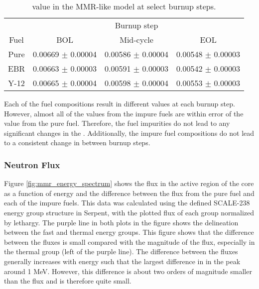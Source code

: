\begin{table}
        \centering
        \caption{\betaEff value in the \gls{MMR}-like model at 
        select burnup steps.}
        \label{tab:mmr_betaeff}
        \begin{tabular}{c c c c}
                \hline 
                 & \multicolumn{3}{c}{Burnup step}\\
                Fuel & \gls{BOL} & Mid-cycle & \gls{EOL}\\
                \hline 
                Pure & 0.00669 $\pm$ 0.00004 & 0.00586 $\pm$ 0.00004 & 0.00548 $\pm$ 0.00003\\
                \gls{EBR} & 0.00663 $\pm$ 0.00003 & 0.00591 $\pm$ 0.00003 & 0.00542 $\pm$ 0.00003\\
                Y-12 & 0.00665 $\pm$ 0.00004 &  0.00598 $\pm$ 0.00004& 0.00553 $\pm$ 0.00003\\
                \hline 

        \end{tabular}
\end{table}

Each of the fuel compositions result in different \betaEff values at 
each burnup step. However, almost all of the values from the impure 
fuels are within error of the value from the pure fuel. Therefore, the 
fuel impurities do not lead to any significant changes in the 
\betaEff. Additionally, the impure fuel compositions do not lead to 
a consistent change in \betaEff between burnup steps. 

\subsubsection{Neutron Flux}

Figure \ref{fig:mmr_energy_spectrum} shows the flux in the active 
region of the core as a function of energy and the difference between 
the flux from the pure fuel and each of the impure fuels. This data was 
calculated using the defined SCALE-238 energy group structure in Serpent,
with the plotted flux of each group normalized by lethargy. The purple 
line in both plots in the figure shows the delineation between the fast and 
thermal energy groups. This figure shows that the difference between 
the fluxes is small compared with the magnitude of the flux, especially in 
the thermal group (left of the purple line). The difference between the 
fluxes generally increases with energy such that the largest difference in 
in the peak around 1 MeV. However, this difference is about two orders 
of magnitude smaller than the flux and is therefore quite small. 

